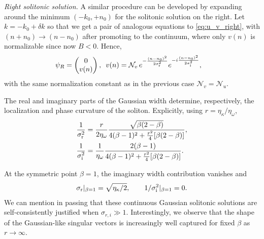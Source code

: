 \documentclass[a4paper,twocolumn,floatfix,10pt,superscriptaddress]%
{quantumarticle}
\newcommand{\dptc}[1]{{\color{dptcolor}{[D: #1]}}}
\newcommand{\mcl}[1]{\mathcal{#1}}
\begin{document}
\emph{Right solitonic solution.}
A similar procedure can be developed by expanding around the minimum $(-k_0,+n_0)$ for the solitonic solution on the right. 
Let $k=-k_0+\delta k$
so that we get a pair of analogous equations to \eqref{eq:u_v_right}, with $(n+n_0)\rightarrow (n-n_0)$ 
after promoting to the continuum, where only $v(n)$ is normalizable since now $B < 0$.
Hence,
\begin{align}
\begin{aligned}
\psi_{R}&=
\begin{pmatrix}0\\v(n)\end{pmatrix},
\,\,\,
v(n)=\mcl{N}_v\,e^{-\frac{(n-n_0)^2}{2\sigma_{\rm r}^2}}
      e^{-i\frac{(n-n_0)^2}{2\sigma_{\rm i}^2}},
\end{aligned}
\end{align}
with the same normalization constant as in the previous case $\mcl{N}_v=\mcl{N}_u$.

The real and imaginary parts of the Gaussian width determine, respectively, the localization and phase curvature of the soliton. Explicitly, using $r=\eta_\kappa/\eta_\omega$,
\begin{align}
\frac{1}{\sigma_{\rm r}^2}
&=\frac{r}{2\eta_\omega}
  \frac{\sqrt{\beta(2-\beta)}}
       {4(\beta-1)^2+\frac{r^2}{4}[\beta(2-\beta)]},\\
\frac{1}{\sigma_{\rm i}^2}
&=\frac{1}{\eta_\omega}
  \frac{2(\beta-1)}
       {4(\beta-1)^2+\frac{r^2}{4}[\beta(2-\beta)]}.
\label{widths}       
\end{align}

At the symmetric point $\beta=1$, the imaginary width contribution vanishes and
\dptc{the Jackiw-Rebbi solitons have their minimum width}
%
\begin{equation}
\sigma_{\rm r}|_{\beta=1}=\sqrt{\eta_\kappa/2},\qquad
1/\sigma_{\rm i}^2|_{\beta=1}=0.
\end{equation}
%
We can mention in passing that these continuous Gaussian solitonic solutions are self-consistently justified when $\sigma_{r,i}\gg 1$. Interestingly, we observe that the shape of the Gaussian-like singular vectors is increasingly well captured for fixed $\beta$ as  $r\rightarrow \infty$.
\end{document}
